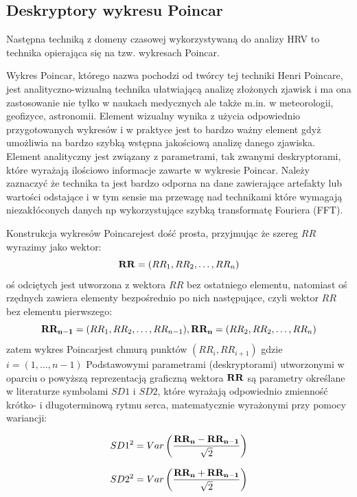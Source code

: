 \subsection{Deskryptory wykresu Poincar\ee}


Następna techniką z domeny czasowej wykorzystywaną do analizy HRV to technika opierająca
się na tzw. wykresach Poincar\ee.

Wykres Poincar\ee, którego nazwa pochodzi od twórcy tej techniki Henri Poincare, jest 
analityczno-wizualną technika ułatwiającą analizę złożonych zjawisk i ma ona zastosowanie
nie tylko w naukach medycznych ale także m.in. w meteorologii, geofizyce, astronomii.
Element wizualny wynika z użycia odpowiednio przygotowanych wykresów i w praktyce jest to
bardzo ważny element gdyż umożliwia na bardzo szybką wstępna jakościową analizę danego
zjawiska. Element analityczny jest związany z parametrami, tak zwanymi deskryptorami,
które wyrażają ilościowo informacje zawarte w wykresie Poincar\ee. Należy zaznaczyć że
technika ta jest bardzo odporna na dane zawierające artefakty lub wartości odstające i w
tym sensie ma przewagę nad technikami które wymagają niezakłóconych danych np 
wykorzystujące szybką transformatę Fouriera (FFT).

Konstrukcja wykresów Poincare\ee  jest dość prosta, przyjmując że szereg $RR$ wyrazimy jako
wektor:
\begin{equation}
\mathbf{RR} = (RR_{1}, RR_{2}, \ldots, RR_{n})
\end{equation}
oś odciętych jest utworzona z wektora $RR$ bez ostatniego elementu, natomiast oś rzędnych
zawiera elementy bezpośrednio po nich następujące, czyli wektor $RR$ bez elementu
pierwszego:
\begin{equation}
\mathbf{RR_{n-1}} = (RR_{1}, RR_{2}, \ldots, RR_{n-1}),
\mathbf{RR_n} = (RR_{2}, RR_{2}, \ldots, RR_{n}) 
\end{equation}
zatem wykres Poincar\ee jest chmurą punktów $(RR_{i}, RR_{i+1})$ gdzie $i=(1, \ldots, n-1)$
Podstawowymi parametrami (deskryptorami) utworzonymi w oparciu o powyższą reprezentacją 
graficzną wektora $\mathbf{RR}$ są parametry określane w literaturze symbolami $SD1$ i $SD2$, które
wyrażają odpowiednio zmienność krótko- i długoterminową rytmu serca,
matematycznie wyrażonymi przy pomocy wariancji:

\begin{equation}
SD1^2 = Var\left(\frac{\mathbf{RR_n} - \mathbf{RR_{n-1}}}{\sqrt{2}}\right)
\end{equation}

\begin{equation}
SD2^2 = Var\left(\frac{\mathbf{RR_n} + \mathbf{RR_{n-1}}}{\sqrt{2}}\right)
\end{equation}

